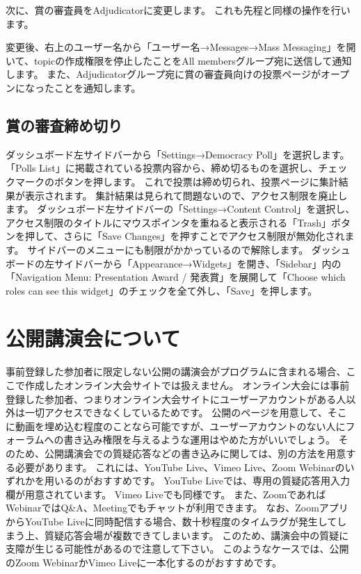\documentclass[titlepage,10pt,a4paper,uplatex]{jsbook}
\begin{document}
次に、賞の審査員をAdjudicatorに変更します。
これも先程と同様の操作を行います。

変更後、右上のユーザー名から「ユーザー名→Messages→Mass Messaging」を開いて、topicの作成権限を停止したことをAll membersグループ宛に送信して通知します。
また、Adjudicatorグループ宛に賞の審査員向けの投票ページがオープンになったことを通知します。

\subsection{賞の審査締め切り}

ダッシュボード左サイドバーから「Settings→Democracy Poll」を選択します。
「Polls List」に掲載されている投票内容から、締め切るものを選択し、チェックマークのボタンを押します。
これで投票は締め切られ、投票ページに集計結果が表示されます。
集計結果は見られて問題ないので、アクセス制限を廃止します。
ダッシュボード左サイドバーの「Settings→Content Control」を選択し、アクセス制限のタイトルにマウスポインタを重ねると表示される「Trash」ボタンを押して、さらに「Save Changes」を押すことでアクセス制限が無効化されます。
サイドバーのメニューにも制限がかかっているので解除します。
ダッシュボードの左サイドバーから「Appearance→Widgets」を開き、「Sidebar」内の「Navigation Menu: Presentation Award / 発表賞」を展開して「Choose which roles can see this widget」のチェックを全て外し、「Save」を押します。

\section{公開講演会について}

事前登録した参加者に限定しない公開の講演会がプログラムに含まれる場合、ここで作成したオンライン大会サイトでは扱えません。
オンライン大会には事前登録した参加者、つまりオンライン大会サイトにユーザーアカウントがある人以外は一切アクセスできなくしているためです。
公開のページを用意して、そこに動画を埋め込む程度のことなら可能ですが、ユーザーアカウントのない人にフォーラムへの書き込み権限を与えるような運用はやめた方がいいでしょう。
そのため、公開講演会での質疑応答などの書き込みに関しては、別の方法を用意する必要があります。
これには、YouTube Live、Vimeo Live、Zoom Webinarのいずれかを用いるのがおすすめです。
YouTube Liveでは、専用の質疑応答用入力欄が用意されています。
Vimeo Liveでも同様です。
また、ZoomであればWebinarではQ\&A、Meetingでもチャットが利用できます。
なお、ZoomアプリからYouTube Liveに同時配信する場合、数十秒程度のタイムラグが発生してしまう上、質疑応答会場が複数できてしまいます。
このため、講演会中の質疑に支障が生じる可能性があるので注意して下さい。
このようなケースでは、公開のZoom WebinarかVimeo Liveに一本化するのがおすすめです。
\end{document}
